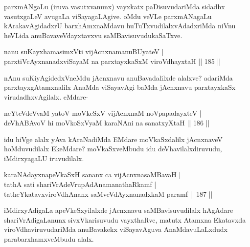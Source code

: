 \begin{artha}%
parxmANgaLu (iruva vasutxvanunx) vayxkatx paDisuvudariMda sidadhx vasutxgaLeV avugaLa viSayagaLAgive. oMdu veVLe parxmANagaLu kArakavAgidadxrU barxhAmxnaMdavu huTuTxvudilalxvAdadxriMda niVnu heVLida anuBavaveVdayxtavxvu saMBavisuvudukaSaTxve.
\end{artha}


\begin{shl}
nanu suKayxhamasimxVti vijAcnxnamanuBUyateV |\\
parxtiVcAyxnanadxviSayaM na parxtayxkaSxM viroVdhayxtaH \hfill || 185 ||
\end{shl}

\begin{artha}
nAnu suKiyAgidedxVneMdu jAcnxnavu anuBavadalilxde alalxve? adariMda parxtayxgAtamxnalilx AnaMda viSayavAgi baMda jAcnxnavu parxtayxkaSx virudadhxvAgilalx. eMdare-
\end{artha}


\begin{shl}
neYteVdeVvaM yatoV moVkeSxV vijAcnxnaM noVpapadayxteV |\\
deVhABAvoV hi moVkoSxV\s yaM karaNAni na sanatxyXtaH \hfill || 186 ||
\end{shl}

\begin{artha}
idu hiVge alalx yAva kAraNadiMda EMdare moVkaSxdalilx jAcnxnaveV hoMduvudilalx EkeMdare? moVkaSxveMbudu idu deVhavilalxdiruvudu, iMdirxyagaLU iruvudilalx. 
\end{artha}

\begin{shl}
karaNAdayxnapeVkaSxH sananx ca vijAcnxnasaMBavaH |\\
tathA sati shariVrAdeVrupAdAnamanathaRkamf |\\
tatheYkatavxviroVdhAnanx saMveVdAyxnanadxkaM paramf \hfill || 187 ||
\end{shl}

\begin{artha}
iMdirxyAdigaLa apeVkeSxyilalxde jAcnxnavu saMBavisuvudilalx hAgAdare shariVrAdigaLanunx sivxVkarisuvudu vayxthaRve, matutx Atamxna Ekatavxda viroVdhaviruvudariMda anuBavakekx viSayavAguva AnaMdavuLaLxdudx parabarxhamxveMbudu alalx.
\end{artha}%


